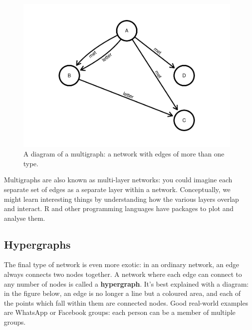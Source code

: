 \documentclass[
]{book}
\begin{document}
\begin{figure}
\centering
\includegraphics{_main_files/figure-latex/unnamed-chunk-2-1.pdf}
\caption{\label{fig:unnamed-chunk-2}A diagram of a multigraph: a network with edges of more than one type.}
\end{figure}

Multigraphs are also known as multi-layer networks: you could imagine each separate set of edges as a separate layer within a network. Conceptually, we might learn interesting things by understanding how the various layers overlap and interact. R and other programming languages have packages to plot and analyse them.

\hypertarget{hypergraphs}{%
\subsection{Hypergraphs}\label{hypergraphs}}

The final type of network is even more exotic: in an ordinary network, an edge always connects two nodes together. A network where each edge can connect to any number of nodes is called a \textbf{hypergraph}. It's best explained with a diagram: in the figure below, an edge is no longer a line but a coloured area, and each of the points which fall within them are connected nodes. Good real-world examples are WhatsApp or Facebook groups: each person can be a member of multiple groups.
\end{document}
